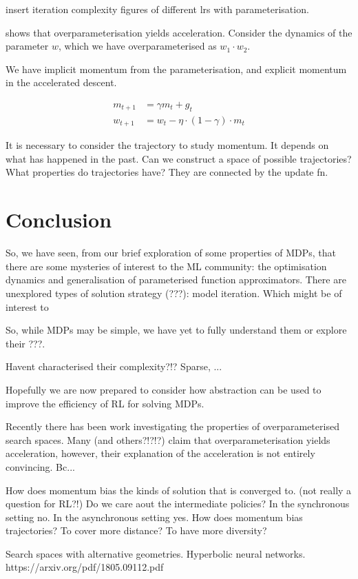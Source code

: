 {\color{red}insert iteration complexity figures of different lrs with parameterisation.}

\cite{Arora2018} shows that overparameterisation yields acceleration. Consider
the dynamics of the parameter $w$, which we have overparameterised as $w_1 \cdot w_2$.



We have implicit momentum from the parameterisation, and explicit momentum in the accelerated descent.


\begin{align}
m_{t+1} &= \gamma m_t + g_t \\
w_{t+1} &= w_t - \eta \cdot (1-\gamma) \cdot m_t
\end{align}

It is necessary to consider the trajectory to study momentum. It depends
on what has happened in the past. Can we construct a space of possible
trajectories? What properties do trajectories have? They are connected
by the update fn.


\section{Conclusion}

So, we have seen, from our brief exploration of some properties of MDPs, that
there are some mysteries of interest to the ML community: the optimisation dynamics and generalisation of
parameterised function approximators.
There are unexplored types of solution strategy (???): model iteration. Which might be of interest to

So, while MDPs may be simple, we have yet to fully understand them or explore their ???.

Havent characterised their complexity?!? Sparse, ...

Hopefully we are now prepared to consider how abstraction can be used to improve the efficiency of RL for solving MDPs.



Recently there has been work investigating the properties of overparameterised search spaces.
Many \cite{Arora2018} (and others?!?!?) claim that overparameterisation yields acceleration, however,
their explanation of the acceleration is not entirely convincing. Bc...

How does momentum bias the kinds of solution that is converged to. (not really a question for RL?!)
Do we care aout the intermediate policies? In the synchronous setting no. In the asynchronous setting yes.
How does momentum bias trajectories? To cover more distance? To have more diversity?

Search spaces with alternative geometries.
Hyperbolic neural networks. https://arxiv.org/pdf/1805.09112.pdf
